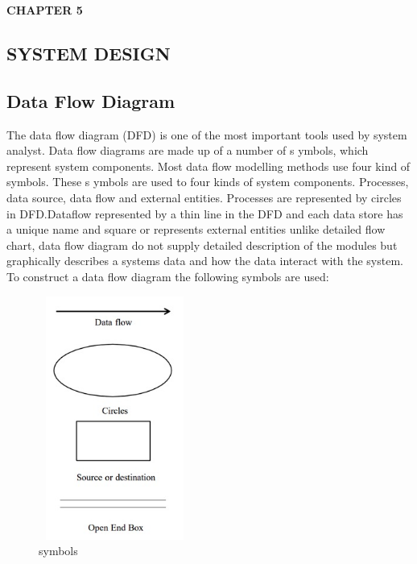 \documentclass[12pt]{article}
\begin{document}
\newpage
\begin{flushleft}\textbf{CHAPTER 5} \end{flushleft}
\begin{flushleft}\section{SYSTEM DESIGN} \end{flushleft}
\vspace*{10px}

\subsection{Data Flow Diagram}

The data flow diagram (DFD) is one of the most important tools used by system
analyst. Data flow diagrams are made up of a number of s ymbols, which represent
system components. Most data flow modelling methods use four kind of symbols.
These s ymbols are used to four kinds of system components. Processes, data source,
data flow and external entities. 
Processes are represented by circles in DFD.Dataflow represented by a thin
line in the DFD and each data store has a unique name and square or represents
external entities unlike detailed flow chart, data flow diagram do not supply detailed
description of the modules but graphically describes a systems data and how the data
interact with the system.
To construct a data flow diagram the following symbols are used:


\begin{figure}[h!]
\begin{center}
\includegraphics[width=5cm, height=8cm]{DFD}
\caption{symbols}
\end{center}
\end{figure}
\end{document}
